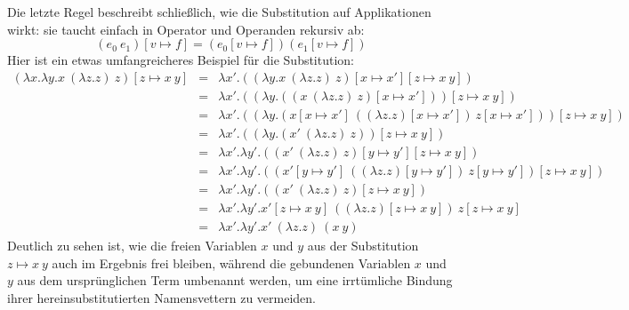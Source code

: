 Die letzte Regel beschreibt schließlich, wie die Substitution auf
Applikationen wirkt: sie taucht einfach in Operator und Operanden
rekursiv ab:
%
\begin{displaymath}
      (e_0~e_1)[v\mapsto f] = (e_0[v\mapsto f])(e_1[v\mapsto f])
\end{displaymath}
%
Hier ist ein etwas umfangreicheres Beispiel für die Substitution:
%
\begin{eqnarray*}
  (\lambda x.\lambda y.x~(\lambda z.z)~z)[z \mapsto x~y]
  &=&
  \lambda x'.((\lambda y.x~(\lambda z.z)~z)[x\mapsto x'][z \mapsto x~y])
  \\ &=&
  \lambda x'.((\lambda y.((x~(\lambda z.z)~z)[x\mapsto x']))[z \mapsto x~y])
  \\ &=&
  \lambda x'.((\lambda y.(x[x\mapsto x']~((\lambda z.z)[x\mapsto x'])~z[x\mapsto x']))[z \mapsto x~y])
  \\ &=&
  \lambda x'.((\lambda y.(x'~(\lambda z.z)~z))[z \mapsto x~y])
  \\ &=&
  \lambda x'.\lambda y'.((x'~(\lambda z.z)~z)[y \mapsto y'][z \mapsto x~y])
  \\ &=&
  \lambda x'.\lambda y'.((x'[y \mapsto y']~((\lambda z.z)[y \mapsto y'])~z[y \mapsto y'])[z \mapsto x~y])
  \\ &=&
  \lambda x'.\lambda y'.((x'~(\lambda z.z)~z)[z \mapsto x~y])
  \\ &=&
  \lambda x'.\lambda y'.x'[z \mapsto x~y]~((\lambda z.z)[z \mapsto x~y])~z[z \mapsto x~y]
  \\ &=&
  \lambda x'.\lambda y'.x'~(\lambda z.z)~(x~y)
\end{eqnarray*}
%
Deutlich zu sehen ist, wie die freien Variablen $x$ und $y$ aus der
Substitution $z\mapsto x~y$ auch im Ergebnis frei bleiben, während die
gebundenen Variablen $x$ und $y$ aus dem ursprünglichen Term umbenannt
werden, um eine irrtümliche Bindung ihrer hereinsubstitutierten
Namensvettern zu vermeiden.

